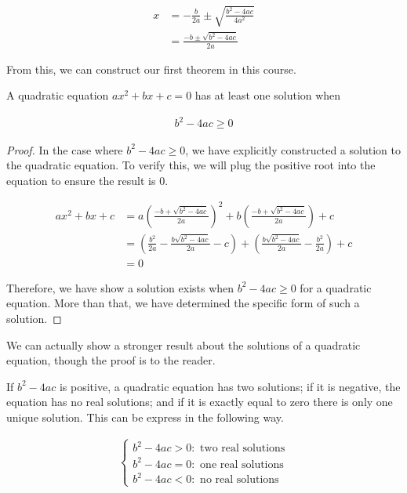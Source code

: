 \documentclass[twoside]{report}
\begin{document}
\begin{align}
	x &= - \frac{b}{2a} \pm \sqrt{\frac{b^2 - 4ac}{4a^2}} \\ 
	&= \frac{-b \pm \sqrt{b^2 - 4ac}}{2a}
\end{align}

From this, we can construct our first theorem in this course.

\vspace{\baselineskip}
\begin{theorem}
	A quadratic equation $ax^2 + bx + c = 0$ has at least one solution when
	
	\begin{align}
		b^2 - 4ac \ge 0
	\end{align}
\end{theorem}

\begin{proof}
	In the case where $b^2 - 4ac \ge 0$, we have explicitly constructed a solution to the quadratic equation. To verify this, we will plug the positive root into the equation to ensure the result is 0.
	
	\begin{align*}
		ax^2 + bx + c
		&= a \left( \frac{-b + \sqrt{b^2 - 4ac}}{2a} \right)^2 + b \left( \frac{-b + \sqrt{b^2 - 4ac}}{2a} \right) + c \\
		&= \left( \frac{b^2}{2a} - \frac{b\sqrt{b^2 - 4ac}}{2a} - c\right) + \left( \frac{b\sqrt{b^2 - 4ac}}{2a} - \frac{b^2}{2a}\right) + c \\
		&= 0
	\end{align*}
	
	Therefore, we have show a solution exists when  $b^2 - 4ac \ge 0$ for a quadratic equation. More than that, we have determined the specific form of such a solution.
\end{proof}
\vspace{\baselineskip}

We can actually show a stronger result about the solutions of a quadratic equation, though the proof is to the reader.

\begin{theorem}
	If $b^2 - 4ac$ is positive, a quadratic equation has two solutions; if it is negative, the equation has no real solutions; and if it is exactly equal to zero there is only one unique solution. This can be express in the following way.
	
	\begin{align*}
		\begin{cases}
			b^2 - 4ac > 0 : \text{ two real solutions} \\
			b^2 - 4ac = 0 : \text{ one real solutions} \\
			b^2 - 4ac < 0 : \text{ no real solutions}
		\end{cases}
	\end{align*}
\end{theorem}
\end{document}
